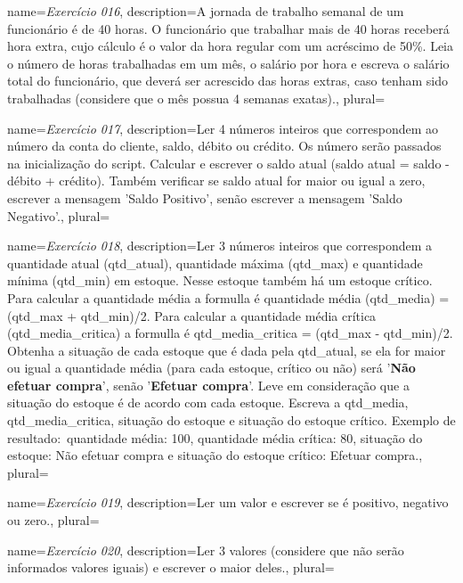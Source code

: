 {
	name={\textit{Exercício 016}},
	description={A jornada de trabalho semanal de um funcionário é de 40 horas. O funcionário que trabalhar mais de 40 horas receberá hora extra, cujo cálculo é o valor da hora regular com um acréscimo de 50\%. Leia o número de horas trabalhadas em um mês, o salário por hora e escreva o salário total do funcionário, que deverá ser acrescido das horas extras, caso tenham sido trabalhadas (considere que o mês possua 4 semanas exatas).},
	plural={}
}



{
	name={\textit{Exercício 017}},
	description={Ler 4 números inteiros que correspondem ao número da conta do cliente, saldo, débito ou crédito. Os número serão passados na inicialização do script. Calcular e escrever o saldo atual (saldo atual = saldo - débito + crédito). Também verificar se saldo atual for maior ou igual a zero, escrever a mensagem 'Saldo Positivo', senão escrever a mensagem 'Saldo Negativo'.},
	plural={}
}


{
	name={\textit{Exercício 018}},
	description={Ler 3 números inteiros que correspondem a quantidade atual (qtd\_atual), quantidade máxima (qtd\_max) e quantidade mínima (qtd\_min) em estoque. Nesse estoque também há um estoque crítico. Para calcular a quantidade média a formulla é quantidade média (qtd\_media) = (qtd\_max + qtd\_min)/2. Para calcular a quantidade média crítica (qtd\_media\_critica) a formulla é qtd\_media\_critica = (qtd\_max - qtd\_min)/2. Obtenha a situação de cada estoque que é dada pela qtd\_atual, se ela for maior ou igual a quantidade média (para cada estoque, crítico ou não) será '\textbf{Não efetuar compra}', senão '\textbf{Efetuar compra}'. Leve em consideração que a situação do estoque é de acordo com cada estoque. Escreva a qtd\_media, qtd\_media\_critica, situação do estoque e situação do estoque crítico. Exemplo de resultado:\ quantidade média: 100, quantidade média crítica: 80, situação do estoque: Não efetuar compra e situação do estoque crítico: Efetuar compra.},
	plural={}
}



{
	name={\textit{Exercício 019}},
	description={Ler um valor e escrever se é positivo, negativo ou zero.},
	plural={}
}



{
	name={\textit{Exercício 020}},
	description={Ler 3 valores (considere que não serão informados valores iguais) e escrever o maior deles.},
	plural={}
}


